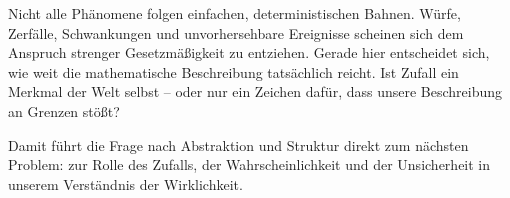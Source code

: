 Nicht alle Phänomene folgen einfachen,
deterministischen Bahnen.
Würfe, Zerfälle, Schwankungen und unvorhersehbare Ereignisse
scheinen sich dem Anspruch strenger Gesetzmäßigkeit zu entziehen.
Gerade hier entscheidet sich,
wie weit die mathematische Beschreibung tatsächlich reicht.
Ist Zufall ein Merkmal der Welt selbst --
oder nur ein Zeichen dafür,
dass unsere Beschreibung an Grenzen stößt?

Damit führt die Frage nach Abstraktion und Struktur
direkt zum nächsten Problem:
zur Rolle des Zufalls,
der Wahrscheinlichkeit
und der Unsicherheit in unserem Verständnis der Wirklichkeit.